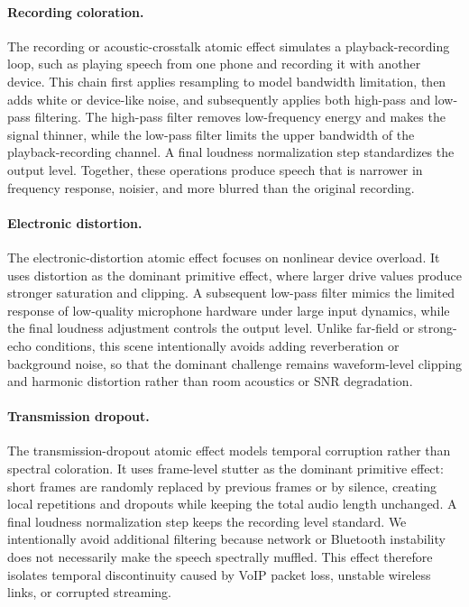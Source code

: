 \documentclass{llmxive}
\begin{document}
\paragraph{Recording coloration.}
The recording or acoustic-crosstalk atomic effect simulates a playback-recording
loop, such as playing speech from one phone and recording it with another
device. This chain first applies resampling to model bandwidth limitation, then
adds white or device-like noise, and subsequently applies both high-pass and
low-pass filtering. The high-pass filter removes low-frequency energy and makes
the signal thinner, while the low-pass filter limits the upper bandwidth of the
playback-recording channel. A final loudness normalization step standardizes
the output level. Together, these operations produce speech that is narrower in
frequency response, noisier, and more blurred than the original recording.

\paragraph{Electronic distortion.}
The electronic-distortion atomic effect focuses on nonlinear device overload.
It uses distortion as the dominant primitive effect, where larger drive values
produce stronger saturation and clipping. A subsequent low-pass filter mimics
the limited response of low-quality microphone hardware under large input
dynamics, while the final loudness adjustment controls the output level. Unlike
far-field or strong-echo conditions, this scene intentionally avoids adding
reverberation or background noise, so that the dominant challenge remains
waveform-level clipping and harmonic distortion rather than room acoustics or
SNR degradation.

\paragraph{Transmission dropout.}
The transmission-dropout atomic effect models temporal corruption rather than
spectral coloration. It uses frame-level stutter as the dominant primitive
effect: short frames are randomly replaced by previous frames or by silence,
creating local repetitions and dropouts while keeping the total audio length
unchanged. A final loudness normalization step keeps the recording level
standard. We intentionally avoid additional filtering because network or
Bluetooth instability does not necessarily make the speech spectrally muffled.
This effect therefore isolates temporal discontinuity caused by VoIP packet
loss, unstable wireless links, or corrupted streaming.
\end{document}
